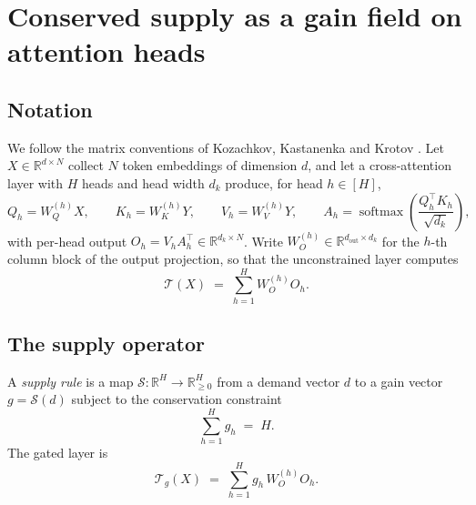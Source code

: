 %

\section{Conserved supply as a gain field on attention heads}

\subsection{Notation}

We follow the matrix conventions of Kozachkov, Kastanenka and Krotov
\cite{kozachkov2023}. Let $X \in \mathbb{R}^{d \times N}$ collect $N$ token
embeddings of dimension $d$, and let a cross-attention layer with $H$ heads and
head width $d_k$ produce, for head $h \in [H]$,
\begin{equation}
  Q_h = W_Q^{(h)} X, \qquad K_h = W_K^{(h)} Y, \qquad V_h = W_V^{(h)} Y,
  \qquad
  A_h = \operatorname{softmax}\!\left( \frac{Q_h^{\top} K_h}{\sqrt{d_k}} \right),
\end{equation}
with per-head output $O_h = V_h A_h^{\top} \in \mathbb{R}^{d_k \times N}$. Write
$W_O^{(h)} \in \mathbb{R}^{d_{\mathrm{out}} \times d_k}$ for the $h$-th column block
of the output projection, so that the unconstrained layer computes
\begin{equation}
  \label{eq:dense}
  \mathcal{T}(X) \;=\; \sum_{h=1}^{H} W_O^{(h)} O_h .
\end{equation}

\subsection{The supply operator}

\begin{definition}
\label{def:supply}
A \emph{supply rule} is a map $\mathcal{S} : \mathbb{R}^{H} \to \mathbb{R}_{\ge 0}^{H}$
from a demand vector $d$ to a gain vector $g = \mathcal{S}(d)$ subject to the
conservation constraint
\begin{equation}
  \label{eq:conservation}
  \sum_{h=1}^{H} g_h \;=\; H .
\end{equation}
The gated layer is
\begin{equation}
  \label{eq:gated}
  \mathcal{T}_g(X) \;=\; \sum_{h=1}^{H} g_h\, W_O^{(h)} O_h .
\end{equation}
\end{definition}

